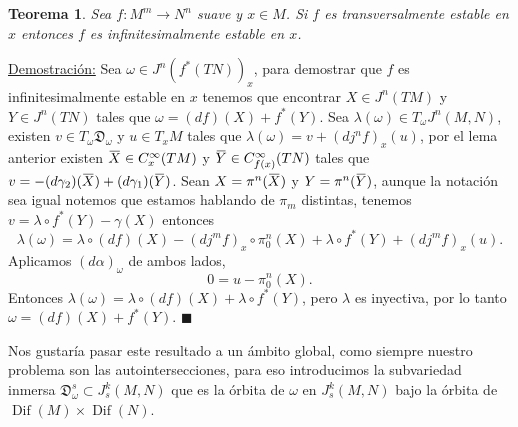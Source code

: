 \documentclass{report}
\newtheorem{theorem}{Teorema}[section]
\theoremstyle{definition}
\DeclareMathOperator{\dif}{Dif}
\newcommand{\overbar}[1]{\mkern 1.5mu\overline{\mkern-1.5mu#1\mkern-1.5mu}\mkern 1.5mu}
\begin{document}
\begin{theorem}
Sea $f: M^m \to N^n$ suave y $x \in M$. Si $f$ es transversalmente estable en $x$ entonces $f$ es infinitesimalmente estable en $x$.
\end{theorem}

\underline{Demostraci\'on:} Sea $\omega \in J^n (f^\ast (TN))_x$, para demostrar que $f$ es infinitesimalmente estable en $x$ tenemos que encontrar $X \in J^n (TM)$ y $Y \in J^n (TN)$ tales que $\omega = (df)(X) + f^\ast (Y)$. Sea $\lambda(\omega) \in T_\omega J^n (M,N)$, existen $v \in T_\omega \mathfrak{D}_\omega$ y $u \in T_x M$ tales que $\lambda (\omega) = v + (d j^n f)_x (u)$, por el lema anterior existen $\overbar{X} \in C^\infty_x (TM)$ y $\overbar{Y} \in C^\infty_{f(x)} (TN)$ tales que $v = - (d \gamma_2)(\overbar{X}) + (d \gamma_1)(\overbar{Y})$. Sean $X= \pi^n (\overbar{X})$ y $Y= \pi^n (\overbar{Y})$, aunque la notaci\'on sea igual notemos que estamos hablando de $\pi_m$ distintas, tenemos $v= \lambda \circ f^\ast (Y) - \gamma(X)$ entonces
$$\lambda(\omega) = \lambda \circ (df)(X) - (dj^m f)_x \circ \pi^n_0(X) + \lambda \circ  f^\ast  (Y) + (d j^m f)_x(u).$$
Aplicamos $(d\alpha)_\omega$ de ambos lados, $$ 0 = u - \pi_0^n(X).$$
Entonces $\lambda(\omega) =\lambda \circ (df)(X) + \lambda \circ f^\ast (Y)$, pero $\lambda$ es inyectiva, por lo tanto $\omega = (df)(X) + f^\ast (Y)$. $\blacksquare$

Nos gustar\'ia pasar este resultado a un \'ambito global, como siempre nuestro problema son las autointersecciones, para eso introducimos la subvariedad inmersa $\mathfrak{D}_\omega^s \subset  J^k_s(M,N)$ que es la \'orbita de $\omega$ en $J^k_s(M,N)$ bajo la \'orbita de $\dif (M) \times \dif (N)$.
\end{document}
